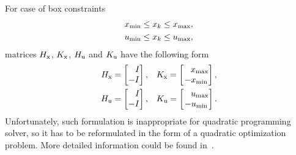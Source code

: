 For case of box constraints
\begin{subequations}
	\begin{align}
		x _{\text{min}}\leq x_k \leq x _{\text{max}},\\
		u _{\text{min}}\leq x_k \leq u _{\text{max}},
	\end{align}
\end{subequations}
matrices $H _{\text{x}}$, $K _{\text{x}}$, $H _{\text{u}}$ and $K _{\text{u}}$ have the following form
\begin{subequations}
	\begin{align}
		H _{\text{x}} = \begin{bmatrix}
						\ \ \,I\\-I
					\end{bmatrix},\quad & 
		K _{\text{x}} = \begin{bmatrix}
						\ \ \,x _{\text{max}}\\-x _{\text{min}}
					\end{bmatrix},\\
		H _{\text{u}} = \begin{bmatrix}
						\ \ \,I\\-I
					\end{bmatrix},\quad & 
		K _{\text{u}} = \begin{bmatrix}
						\ \ \,u _{\text{max}}\\-u _{\text{min}}
					\end{bmatrix}.
	\end{align}
\end{subequations}
Unfortunately, such formulation is inappropriate for quadratic programming solver, so it has to be reformulated in the form of a quadratic optimization problem. More detailed information could be found in~\cite{MPC:kniha}.
